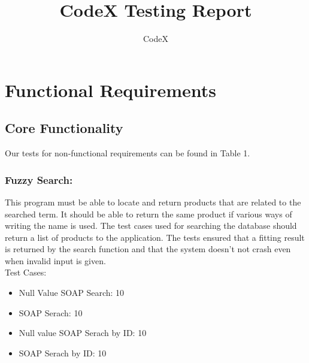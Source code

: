 \documentclass[11pt]{article}
\author{CodeX}
\title{CodeX Testing Report}
\begin{document}
	\setlength{\parskip}{6pt}
	
	
	
	\tableofcontents
	
	\newpage
	
	\section{Functional Requirements}
	\subsection{Core Functionality}
		Our tests for non-functional requirements can be found in Table 1. 
	\subsubsection{Fuzzy Search:}

	This program must be able to locate and return products that are related to the searched term. It should be able to return the same product if various ways of writing the name is used.
	The test cases used for searching the database should return a list of products to the application. The tests ensured that a fitting result is returned by the search function and that the system doesn't not crash even when invalid input is given.\\

	Test Cases:
      \begin{itemize}
      \item Null Value SOAP Search: 10
      \item SOAP Serach: 10
      \item Null value SOAP Serach by ID: 10
      \item SOAP Serach by ID: 10
      \end{itemize}
	
\end{document}
